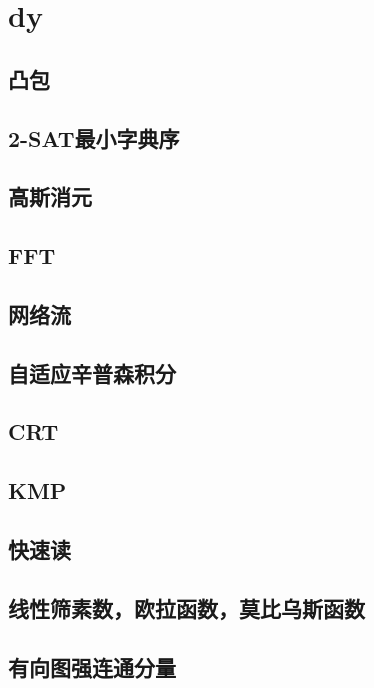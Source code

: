 \section{dy}
	\subsection{凸包}
		
	\subsection{2-SAT最小字典序}
		
	\subsection{高斯消元}
		
	\subsection{FFT}
		
	\subsection{网络流}
		
	\subsection{自适应辛普森积分}
		
	\subsection{CRT}
		
	\subsection{KMP}
		
	\subsection{快速读}
		
	\subsection{线性筛素数，欧拉函数，莫比乌斯函数}
		
	\subsection{有向图强连通分量}
		
